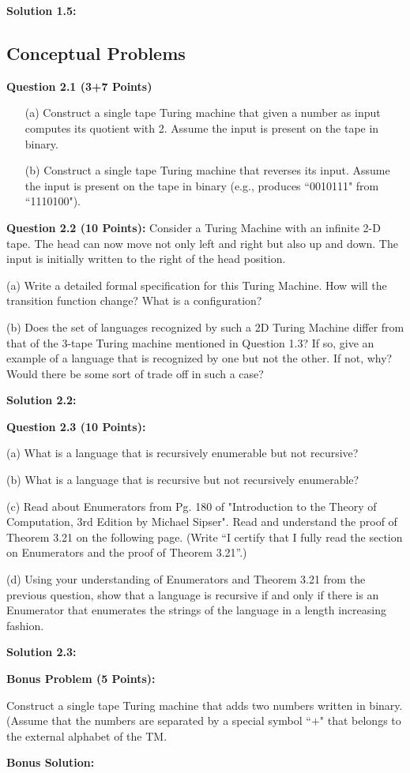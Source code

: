 \documentclass[11pt]{article}
\begin{document}
\textbf{Solution 1.5:}



\subsection{Conceptual Problems}



\textbf{Question 2.1 (3+7 Points)}
\begin{itemize}
\item[(a)] Construct a single tape Turing machine that given a number as input computes its quotient with 2. Assume the input is present on the tape in binary.
\item[(b)] Construct a single tape Turing machine that reverses its input. Assume the input is present on the tape in binary (e.g., produces ``0010111" from ``1110100").
\end{itemize}

\textbf{Question 2.2 (10 Points):} Consider a Turing Machine with an infinite 2-D tape. The head can now move not only left and right but also up and down. The input is initially written to the right of the head position.

(a) Write a detailed formal specification for this Turing Machine. How will the transition function change? What is a configuration?

(b) Does the set of languages recognized by such a 2D Turing Machine differ from that of the 3-tape Turing machine mentioned in Question 1.3? If so, give an example of a language that is recognized by one but not the other. If not, why? Would there be some sort of trade off in such a case?

\textbf{Solution 2.2:}

\textbf{Question 2.3 (10 Points):}

(a) What is a language that is recursively enumerable but not recursive? 

(b) What is a language that is recursive but not recursively enumerable?

(c) Read about Enumerators from Pg. 180 of "Introduction to the Theory of Computation, 3rd Edition by Michael Sipser". Read and understand the proof of Theorem 3.21 on the following page. (Write ``I certify that I fully read the section on Enumerators and the proof of Theorem 3.21''.)

(d) Using your understanding of Enumerators and Theorem 3.21 from the previous question, show that a language is recursive if and only if there is an Enumerator that enumerates the strings of the language in a length increasing fashion.

\textbf{Solution 2.3:}



\textbf{Bonus Problem (5 Points):} 

Construct a single tape Turing machine that adds two numbers written in binary. (Assume that the numbers are separated by a special symbol ``$+$" that belongs to the external alphabet of the \textsc{TM}.

\textbf{Bonus Solution:}
\end{document}
